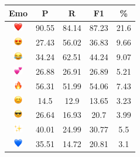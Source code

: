 \documentclass{article}
\begin{document}
\begin{table}
\centering
\begin{tabular}{|c|ccc|c|} \hline
\textbf{Emo} & \textbf{P} & \textbf{R} & \textbf{F1} & \textbf{\%} \\ \hline
\includegraphics[height=0.37cm,width=0.37cm]{img/red_heart.png} & 90.55 & 84.14 & 87.23 & 21.6\\ 
\includegraphics[height=0.37cm,width=0.37cm]{img/smiling_face_with_hearteyes.png} & 27.43 & 56.02 & 36.83 & 9.66\\ 
\includegraphics[height=0.37cm,width=0.37cm]{img/face_with_tears_of_joy.png} & 34.24 & 62.51 & 44.24 & 9.07\\ 
\includegraphics[height=0.37cm,width=0.37cm]{img/two_hearts.png} & 26.88 & 26.91 & 26.89 & 5.21\\ 
\includegraphics[height=0.37cm,width=0.37cm]{img/fire.png} & 56.31 & 51.99 & 54.06 & 7.43\\ 
\includegraphics[height=0.37cm,width=0.37cm]{img/smiling_face_with_smiling_eyes.png} & 14.5 & 12.9 & 13.65 & 3.23\\ 
\includegraphics[height=0.37cm,width=0.37cm]{img/smiling_face_with_sunglasses.png} & 26.64 & 16.93 & 20.7 & 3.99\\ 
\includegraphics[height=0.37cm,width=0.37cm]{img/sparkles.png} & 40.01 & 24.99 & 30.77 & 5.5\\ 
\includegraphics[height=0.37cm,width=0.37cm]{img/blue_heart.png} & 35.51 & 14.72 & 20.81 & 3.1\\ 

\end{tabular}
\end{table}
\end{document}

